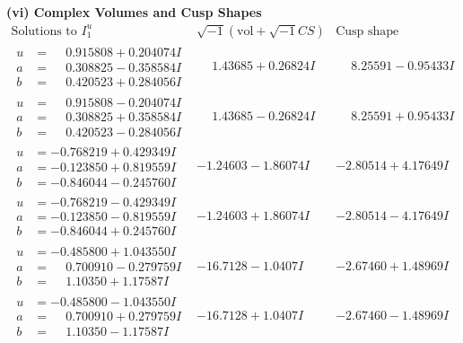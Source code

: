 \documentclass[1p]{elsarticle_modified}
\theoremstyle{definition}
\newcommand{\I}{\sqrt{-1}}
\begin{document}
\newpage\flushleft \textbf{(vi) Complex Volumes and Cusp Shapes}
$$\begin{array}{c|c|c}  
\text{Solutions to }I^u_{1}& \I (\text{vol} + \sqrt{-1}CS) & \text{Cusp shape}\\
 \hline 
\begin{aligned}
u &= \phantom{-}0.915808 + 0.204074 I \\
a &= \phantom{-}0.308825 - 0.358584 I \\
b &= \phantom{-}0.420523 + 0.284056 I\end{aligned}
 & \phantom{-}1.43685 + 0.26824 I & \phantom{-}8.25591 - 0.95433 I \\ \hline\begin{aligned}
u &= \phantom{-}0.915808 - 0.204074 I \\
a &= \phantom{-}0.308825 + 0.358584 I \\
b &= \phantom{-}0.420523 - 0.284056 I\end{aligned}
 & \phantom{-}1.43685 - 0.26824 I & \phantom{-}8.25591 + 0.95433 I \\ \hline\begin{aligned}
u &= -0.768219 + 0.429349 I \\
a &= -0.123850 + 0.819559 I \\
b &= -0.846044 - 0.245760 I\end{aligned}
 & -1.24603 - 1.86074 I & -2.80514 + 4.17649 I \\ \hline\begin{aligned}
u &= -0.768219 - 0.429349 I \\
a &= -0.123850 - 0.819559 I \\
b &= -0.846044 + 0.245760 I\end{aligned}
 & -1.24603 + 1.86074 I & -2.80514 - 4.17649 I \\ \hline\begin{aligned}
u &= -0.485800 + 1.043550 I \\
a &= \phantom{-}0.700910 - 0.279759 I \\
b &= \phantom{-}1.10350 + 1.17587 I\end{aligned}
 & -16.7128 - 1.0407 I & -2.67460 + 1.48969 I \\ \hline\begin{aligned}
u &= -0.485800 - 1.043550 I \\
a &= \phantom{-}0.700910 + 0.279759 I \\
b &= \phantom{-}1.10350 - 1.17587 I\end{aligned}
 & -16.7128 + 1.0407 I & -2.67460 - 1.48969 I \\ \hline\begin{aligned}

\end{aligned}
\end{array}$$
\end{document}
